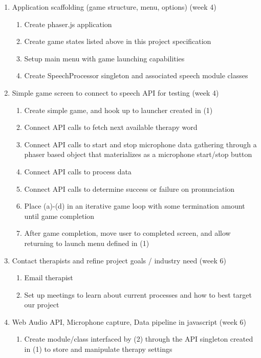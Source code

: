 \documentclass{article}
\begin{document}
\begin{enumerate}
    \item Application scaffolding (game structure, menu, options) (week 4)
    \begin{enumerate}
        \item Create phaser.js application
        \item Create game states listed above in this project specification
        \item Setup main menu with game launching capabilities
        \item Create SpeechProcessor singleton and associated speech module classes
    \end{enumerate}
    \item Simple game screen to connect to speech API for testing (week 4)
    \begin{enumerate}
        \item Create simple game, and hook up to launcher created in (1)
        \item Connect API calls to fetch next available therapy word
        \item Connect API calls to start and stop microphone data gathering through a phaser based object that materializes as a microphone start/stop button
        \item Connect API calls to process data
        \item Connect API calls to determine success or failure on pronunciation
        \item Place (a)-(d) in an iterative game loop with some termination amount until game completion
        \item After game completion, move user to completed screen, and allow returning to launch menu defined in (1)
    \end{enumerate}
    \item Contact therapists and refine project goals / industry need (week 6)
    \begin{enumerate}
        \item Email therapist
        \item Set up meetings to learn about current processes and how to best target our project
    \end{enumerate}
    \item Web Audio API, Microphone capture, Data pipeline in javascript (week 6)
    \begin{enumerate}
        \item Create module/class interfaced by (2) through the API singleton created in (1) to store and manipulate therapy settings

\end{enumerate}
\end{enumerate}
\end{document}

